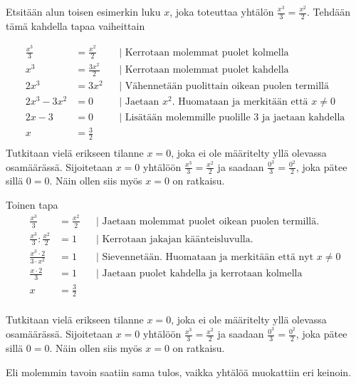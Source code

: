 \begin{esimerkki}
Etsitään alun toisen esimerkin luku $x$, joka toteuttaa yhtälön $\frac{x^3}{3}=\frac{x^2}{2}$. Tehdään tämä kahdella tapaa vaiheittain

		\begin{align*}
			\frac{x^3}{3}&=\frac{x^2}{2} && \text{| Kerrotaan molemmat puolet kolmella} \\
			x^3 &=\frac{3x^2}{2}   && \text{| Kerrotaan molemmat puolet kahdella} \\
			2x^3 &=3x^2 && \text{| Vähennetään puolittain oikean puolen termillä} \\
			2x^3 -3x^2&=0 && \text{| Jaetaan $x^2$. Huomataan ja merkitään että $x\neq0$} \\
			2x -3&=0 && \text{| Lisätään molemmille puolille $3$ ja jaetaan kahdella} \\ 
			x&=\frac{3}{2} && \\
		\end{align*}
Tutkitaan vielä erikseen tilanne $x=0$, joka ei ole määritelty yllä olevassa osamäärässä. Sijoitetaan $x=0$ yhtälöön $\frac{x^3}{3}=\frac{x^2}{2}$ ja saadaan $\frac{0^3}{3}=\frac{0^2}{2}$, joka pätee sillä $0=0$. Näin ollen siis myös $x=0$ on ratkaisu. 



Toinen tapa
\begin{align*}
\frac{x^3}{3}&=\frac{x^2}{2} && \text{| Jaetaan molemmat puolet oikean puolen termillä. } \\
\frac{x^3}{3}:\frac{x^2}{2}&=1 && \text{| Kerrotaan jakajan käänteisluvulla.} \\
\frac{x^3\cdot2}{3\cdot x^2}&=1 && \text{| Sievennetään. Huomataan ja merkitään että nyt $x\neq0$} \\
\frac{x\cdot2}{3}&=1 && \text{| Jaetaan puolet kahdella ja kerrotaan kolmella} \\
x&=\frac{3}{2} && \\
\end{align*}

Tutkitaan vielä erikseen tilanne $x=0$, joka ei ole määritelty yllä olevassa osamäärässä. Sijoitetaan $x=0$ yhtälöön $\frac{x^3}{3}=\frac{x^2}{2}$ ja saadaan $\frac{0^3}{3}=\frac{0^2}{2}$, joka pätee sillä $0=0$. Näin ollen siis myös $x=0$ on ratkaisu.

Eli molemmin tavoin saatiin sama tulos, vaikka yhtälöä muokattiin eri keinoin.



\end{esimerkki}


